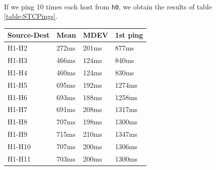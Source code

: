 \documentclass[a4paper, 11pt, oneside]{article}
\begin{document}
\paragraph{}If we ping 10 times each host from \texttt{h0}, we obtain the results of table \ref{table:STCPings}.\\
\begin{table}[H]
\centering
\begin{tabular}{|l|l|l|l|}
\hline
\multicolumn{1}{|c|}{\textbf{Source-Dest}} & \multicolumn{1}{c|}{\textbf{Mean}} & \multicolumn{1}{c|}{\textbf{MDEV}} & \multicolumn{1}{c|}{\textbf{1st ping}} \\ \hline
H1-H2                                      & 272ms                              & 201ms                              & 877ms                                 \\ \hline
H1-H3                                      & 466ms                              & 124ms                              & 840ms                                 \\ \hline
H1-H4                                      & 460ms                              & 124ms                              & 830ms                                 \\ \hline
H1-H5                                      & 695ms                              & 192ms                              & 1274ms                                 \\ \hline
H1-H6                                      & 693ms                              & 188ms                              & 1258ms                                 \\ \hline
H1-H7                                      & 691ms                              & 208ms                              & 1317ms                                 \\ \hline
H1-H8                                      & 707ms                              & 198ms                              & 1300ms                                 \\ \hline
H1-H9                                      & 715ms                              & 210ms                              & 1347ms                                 \\ \hline
H1-H10                                      & 707ms                              & 200ms                              & 1306ms                                 \\ \hline
H1-H11                                     & 703ms                              & 200ms                              & 1300ms                                 \\ \hline

\end{tabular}
\end{table}
\end{document}
